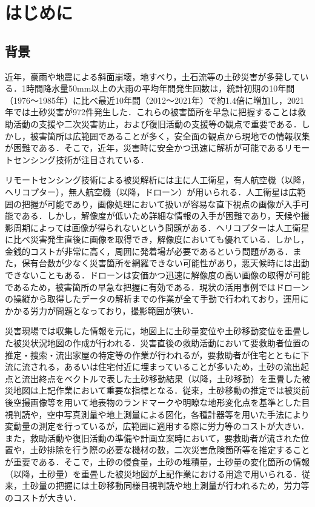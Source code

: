\chapter{はじめに}
  \section{背景}
    近年，豪雨や地震による斜面崩壊，地すべり，土石流等の土砂災害が多発している．1時間降水量50mm以上の大雨の平均年間発生回数は，統計初期の10年間（1976〜1985年）に比べ最近10年間（2012〜2021年）で約1.4倍に増加し，2021年では土砂災害が972件発生した\cite{背景1, 背景2}．これらの被害箇所を早急に把握することは救助活動の支援や二次災害防止，および復旧活動の支援等の観点で重要である．しかし，被害箇所は広範囲であることが多く，安全面の観点から現地での情報収集が困難である\cite{背景3}．そこで，近年，災害時に安全かつ迅速に解析が可能であるリモートセンシング技術が注目されている\cite{背景4}．

    リモートセンシング技術による被災解析には主に人工衛星，有人航空機（以降，ヘリコプター），無人航空機（以降，ドローン）が用いられる．人工衛星は広範囲の把握が可能であり，画像処理において扱いが容易な直下視点の画像が入手可能である．しかし，解像度が低いため詳細な情報の入手が困難であり，天候や撮影周期によっては画像が得られないという問題がある．ヘリコプターは人工衛星に比べ災害発生直後に画像を取得でき，解像度においても優れている．しかし，金銭的コストが非常に高く，周囲に発着場が必要であるという問題がある．また，保有台数が少なく災害箇所を網羅できない可能性があり，悪天候時には出動できないこともある．ドローンは安価かつ迅速に解像度の高い画像の取得が可能であるため，被害箇所の早急な把握に有効である．現状の活用事例ではドローンの操縦から取得したデータの解析までの作業が全て手動で行われており，運用にかかる労力が問題となっており，撮影範囲が狭い\cite{背景5, 背景6, 背景7}．

    災害現場では収集した情報を元に，地図上に土砂量変位や土砂移動変位を重畳した被災状況地図の作成が行われる．災害直後の救助活動において要救助者位置の推定・捜索・流出家屋の特定等の作業が行われるが，要救助者が住宅とともに下流に流される，あるいは住宅付近に埋まっていることが多いため，土砂の流出起点と流出終点をベクトルで表した土砂移動結果（以降，土砂移動）を重畳した被災地図は上記作業において重要な指標となる．従来，土砂移動の推定では被災前後空撮画像等を用いて地表物のランドマークや明瞭な地形変化点を基準とした目視判読や，空中写真測量や地上測量による図化，各種計器等を用いた手法により変動量の測定を行っているが，広範囲に適用する際に労力等のコストが大きい\cite{土砂移動解析背景1, 土砂移動解析背景2}．また，救助活動や復旧活動の準備や計画立案時において，要救助者が流された位置や，土砂排除を行う際の必要な機材の数，二次災害危険箇所等を推定することが重要である．そこで，土砂の侵食量，土砂の堆積量，土砂量の変化箇所の情報（以降，土砂量）を重畳した被災地図が上記作業における用途で用いられる．従来，土砂量の把握には土砂移動同様目視判読や地上測量が行われるため，労力等のコストが大きい\cite{土砂量解析背景1, 土砂量解析背景2}．



